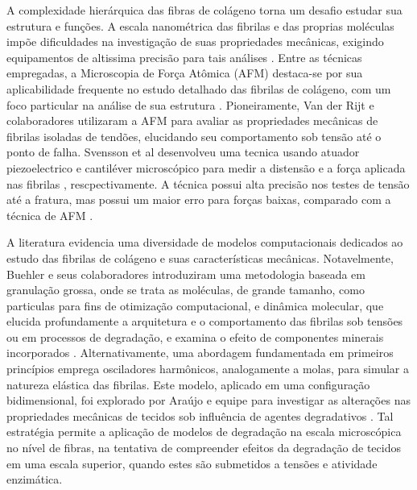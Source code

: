 \documentclass{report}
\begin{document}
    A complexidade hierárquica das fibras de colágeno torna um desafio estudar sua estrutura e funções. A escala nanométrica das
    fibrilas e das proprias moléculas impõe dificuldades na investigação de suas propriedades mecânicas, exigindo equipamentos de 
    altissima precisão para tais análises \cite{Nalbach2022InstrumentFT}. Entre as técnicas empregadas, a Microscopia de Força Atômica 
    (AFM) destaca-se por sua aplicabilidade frequente no estudo detalhado das fibrilas de colágeno, com um foco particular na análise de 
    sua estrutura \cite{Andriotis2015-lx,Mull2022-br}. Pioneiramente, Van der Rijt e colaboradores \cite{Rijt} utilizaram a AFM para 
    avaliar as propriedades mecânicas de fibrilas isoladas de tendões, elucidando seu comportamento sob tensão até o ponto de falha. 
    Svensson et al desenvolveu uma tecnica usando atuador piezoelectrico e cantiléver microscópico para medir a distensão e a força 
    aplicada nas fibrilas \cite{SVENSSON2018270}, rescpectivamente. A técnica possui alta precisão nos testes de tensão até a fratura,
    mas possui um maior erro para forças baixas, comparado com a técnica de AFM \cite{ANDRIOTIS202335}.

    A literatura evidencia uma diversidade de modelos computacionais dedicados ao estudo das fibrilas de colágeno e suas características 
    mecânicas. Notavelmente, Buehler e seus colaboradores \cite{B1,B2,B3} introduziram uma metodologia baseada em granulação grossa, onde se
    trata as moléculas, de grande tamanho, como particulas para fins de otimização computacional, e dinâmica molecular, que elucida profundamente a arquitetura 
    e o comportamento das fibrilas sob tensões ou em processos de degradação, e examina o efeito de componentes minerais incorporados 
    \cite{B4,Malaspina2017-qp,10.1002/jbmr.2705}. Alternativamente, uma abordagem fundamentada em primeiros princípios emprega osciladores 
    harmônicos, analogamente a molas, para simular a natureza elástica das fibrilas. Este modelo, aplicado em uma configuração bidimensional,
    foi explorado por Araújo e equipe para investigar as alterações nas propriedades mecânicas de tecidos sob influência de agentes degradativos
     \cite{Araujo}. Tal estratégia permite a aplicação de modelos de degradação na  escala microscópica no nível de fibras, na tentativa de 
    compreender efeitos da degradação de tecidos em uma escala superior, quando estes são submetidos a tensões e atividade enzimática.
\end{document}
